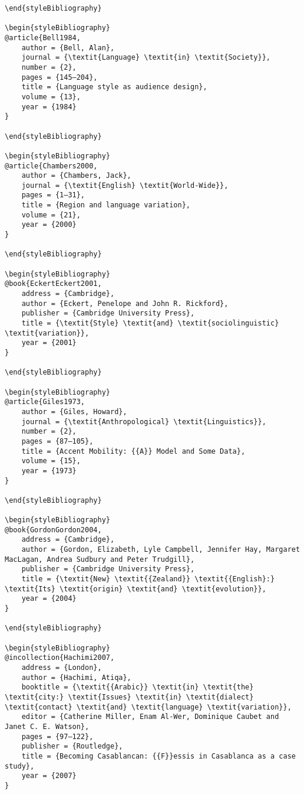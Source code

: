 \documentclass[output=paper]{langsci/langscibook}
\begin{document}
\begin{verbatim}
\end{styleBibliography}

\begin{styleBibliography}
@article{Bell1984,
	author = {Bell, Alan},
	journal = {\textit{Language} \textit{in} \textit{Society}},
	number = {2},
	pages = {145–204},
	title = {Language style as audience design},
	volume = {13},
	year = {1984}
}

\end{styleBibliography}

\begin{styleBibliography}
@article{Chambers2000,
	author = {Chambers, Jack},
	journal = {\textit{English} \textit{World-Wide}},
	pages = {1–31},
	title = {Region and language variation},
	volume = {21},
	year = {2000}
}

\end{styleBibliography}

\begin{styleBibliography}
@book{EckertEckert2001,
	address = {Cambridge},
	author = {Eckert, Penelope and John R. Rickford},
	publisher = {Cambridge University Press},
	title = {\textit{Style} \textit{and} \textit{sociolinguistic} \textit{variation}},
	year = {2001}
}

\end{styleBibliography}

\begin{styleBibliography}
@article{Giles1973,
	author = {Giles, Howard},
	journal = {\textit{Anthropological} \textit{Linguistics}},
	number = {2},
	pages = {87–105},
	title = {Accent Mobility: {{A}} Model and Some Data},
	volume = {15},
	year = {1973}
}

\end{styleBibliography}

\begin{styleBibliography}
@book{GordonGordon2004,
	address = {Cambridge},
	author = {Gordon, Elizabeth, Lyle Campbell, Jennifer Hay, Margaret MacLagan, Andrea Sudbury and Peter Trudgill},
	publisher = {Cambridge University Press},
	title = {\textit{New} \textit{{Zealand}} \textit{{English}:} \textit{Its} \textit{origin} \textit{and} \textit{evolution}},
	year = {2004}
}

\end{styleBibliography}

\begin{styleBibliography}
@incollection{Hachimi2007,
	address = {London},
	author = {Hachimi, Atiqa},
	booktitle = {\textit{{Arabic}} \textit{in} \textit{the} \textit{city:} \textit{Issues} \textit{in} \textit{dialect} \textit{contact} \textit{and} \textit{language} \textit{variation}},
	editor = {Catherine Miller, Enam Al-Wer, Dominique Caubet and Janet C. E. Watson},
	pages = {97–122},
	publisher = {Routledge},
	title = {Becoming Casablancan: {{F}}essis in Casablanca as a case study},
	year = {2007}
}


\end{verbatim}
\end{document}
